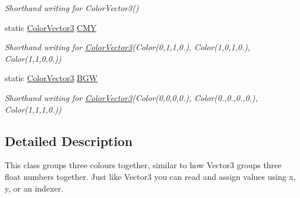 \begin{DoxyCompactItemize}
\begin{DoxyCompactList}\small\item\em Shorthand writing for {\ttfamily Color\+Vector3()}\end{DoxyCompactList}\item 
static \hyperlink{class_grid_framework_1_1_vectors_1_1_color_vector3}{Color\+Vector3} \hyperlink{class_grid_framework_1_1_vectors_1_1_color_vector3_a0c2522e5dab78bb91d254bc0cd88ec0f_a0c2522e5dab78bb91d254bc0cd88ec0f}{C\+M\+Y}
\begin{DoxyCompactList}\small\item\em Shorthand writing for {\ttfamily \hyperlink{class_grid_framework_1_1_vectors_1_1_color_vector3}{Color\+Vector3}(Color(0,1,1,0.), Color(1,0,1,0.), Color(1,1,0,0.))}\end{DoxyCompactList}\item 
static \hyperlink{class_grid_framework_1_1_vectors_1_1_color_vector3}{Color\+Vector3} \hyperlink{class_grid_framework_1_1_vectors_1_1_color_vector3_abebe831b35fa575943e5aafe639dcc10_abebe831b35fa575943e5aafe639dcc10}{B\+G\+W}
\begin{DoxyCompactList}\small\item\em Shorthand writing for {\ttfamily \hyperlink{class_grid_framework_1_1_vectors_1_1_color_vector3}{Color\+Vector3}(Color(0,0,0,0.), Color(0.,0.,0.,0.), Color(1,1,1,0.))}\end{DoxyCompactList}\end{DoxyCompactItemize}


\subsection{Detailed Description}
This class groups three colours together, similar to how Vector3 groups three float numbers together. Just like Vector3 you can read and assign values using x, y, or an indexer. 

